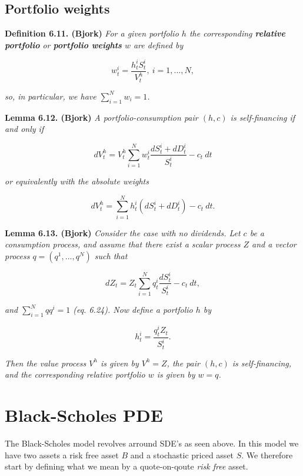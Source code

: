 \documentclass[
]{book}
\begin{document}
\hypertarget{portfolio-weights}{%
\subsection{Portfolio weights}\label{portfolio-weights}}

\textbf{Definition 6.11. (Bjork)} \emph{For a given portfolio \(h\) the corresponding \textbf{relative portfolio} or \textbf{portfolio weights} \(w\) are defined by}

\[
w_t^i=\frac{h_t^iS_t^i}{V_t^h},\ i=1,...,N,\tag{6.21}
\]

\emph{so, in particular, we have \(\sum_{i=1}^N w_i=1\).}

\textbf{Lemma 6.12. (Bjork)} \emph{A portfolio-consumption pair \((h,c)\) is self-financing if and only if}

\[
dV_t^h=V_t^h\sum_{i=1}^N w_t^i\frac{dS_t^i+dD_t^i}{S_t^i}-c_t\ dt\tag{6.22}
\]

\emph{or equivalently with the absolute weights}

\[
dV_t^h=\sum_{i=1}^N h_t^i(dS_t^i+dD_t^i)-c_t\ dt.
\]

\textbf{Lemma 6.13. (Bjork)} \emph{Consider the case with no dividends. Let \(c\) be a consumption process, and assume that there exist a scalar process \(Z\) and a vector process \(q=(q^1,...,q^N)\) such that}

\[
dZ_t=Z_t\sum_{i=1}^N q_t^i\frac{dS_t^i}{S_t^i}-c_t\ dt,\tag{6.23}
\]

\emph{and \(\sum_{i=1}^Nqq^i=1\) (eq. 6.24). Now define a portfolio \(h\) by}

\[
h_t^i=\frac{q_t^iZ_t}{S_t^i}.\tag{6.25}
\]

\emph{Then the value process \(V^h\) is given by \(V^h=Z\), the pair \((h,c)\) is self-financing, and the corresponding relative portfolio \(w\) is given by \(w=q\).}

\newpage

\hypertarget{black-scholes-pde}{%
\section{Black-Scholes PDE}\label{black-scholes-pde}}

The Black-Scholes model revolves arround SDE's as seen above. In this model we have two assets a risk free asset \(B\) and a stochastic priced asset \(S\). We therefore start by defining what we mean by a quote-on-qoute \emph{risk free} asset.
\end{document}
